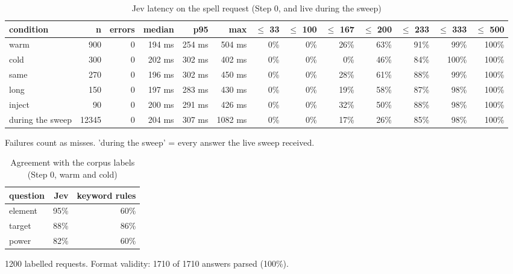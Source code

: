 \begin{table}[ht]
\centering
\small
\caption{Jev latency on the spell request (Step 0, and live during the sweep)}
\label{tab:step0-latency}
\begin{tabular}{lrrrrrrrrrrrr}
\toprule
condition & n & errors & median & p95 & max & $\le$ 33 & $\le$ 100 & $\le$ 167 & $\le$ 200 & $\le$ 233 & $\le$ 333 & $\le$ 500 \\
\midrule
warm & 900 & 0 & 194 ms & 254 ms & 504 ms & 0\% & 0\% & 26\% & 63\% & 91\% & 99\% & 100\% \\
cold & 300 & 0 & 202 ms & 302 ms & 402 ms & 0\% & 0\% & 0\% & 46\% & 84\% & 100\% & 100\% \\
same & 270 & 0 & 196 ms & 302 ms & 450 ms & 0\% & 0\% & 28\% & 61\% & 88\% & 99\% & 100\% \\
long & 150 & 0 & 197 ms & 283 ms & 430 ms & 0\% & 0\% & 19\% & 58\% & 87\% & 98\% & 100\% \\
inject & 90 & 0 & 200 ms & 291 ms & 426 ms & 0\% & 0\% & 32\% & 50\% & 88\% & 98\% & 100\% \\
during the sweep & 12345 & 0 & 204 ms & 307 ms & 1082 ms & 0\% & 0\% & 17\% & 26\% & 85\% & 98\% & 100\% \\
\bottomrule
\end{tabular}
\par\smallskip\footnotesize Failures count as misses. 'during the sweep' = every answer the live sweep received.
\end{table}

\begin{table}[ht]
\centering
\small
\caption{Agreement with the corpus labels (Step 0, warm and cold)}
\label{tab:step0-agreement}
\begin{tabular}{lrr}
\toprule
question & Jev & keyword rules \\
\midrule
element & 95\% & 60\% \\
target & 88\% & 86\% \\
power & 82\% & 60\% \\
\bottomrule
\end{tabular}
\par\smallskip\footnotesize 1200 labelled requests. Format validity: 1710 of 1710 answers parsed (100\%).
\end{table}

